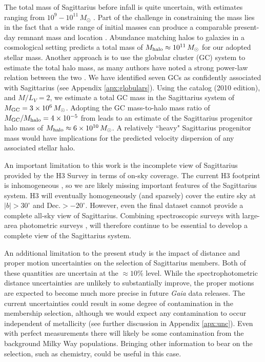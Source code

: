 \documentclass[twocolumn,tighten,twocolappendix]{aastex63}
\newcommand{\sgr}{Sagittarius}
\begin{document}
\begin{CJK*}{UTF8}{gbsn}
The total mass of \sgr{} before infall is quite uncertain, with estimates ranging from $10^{9}-10^{11}\, M_\odot$ \citep[e.g.,][]{Jiang00,Helmi01, LM10, Lokas10, Purcell11, Gibbons17,Laporte18}.  Part of the challenge in constraining the mass lies in the fact that a wide range of initial masses can produce a comparable present-day remnant mass and location \citep[e.g.,][]{Gibbons17}.  Abundance matching halos to galaxies in a cosmological setting predicts a total mass of $M_{\rm halo}\approx10^{11}\, M_\odot$ \citep{Behroozi19} for our adopted stellar mass.  Another approach is to use the globular cluster (GC) system to estimate the total halo mass, as many authors have noted a strong power-law relation between the two \citep[e.g.,][]{Hudson14, Harris17}.  We have identified seven GCs as confidently associated with \sgr{} (see Appendix \ref{apx:globulars}).  Using the \citet{Harris96} catalog (2010 edition), and $M/L_V=2$, we estimate a total GC mass in the \sgr{} system of $M_{\rm GC}=3\times10^6\, M_\odot$.  Adopting the GC mass-to-halo mass ratio of $M_{\rm GC}/M_{\rm halo}=4\times10^{-5}$ from \citet{Hudson14} leads to an estimate of the \sgr{} progenitor halo mass of $M_{\rm halo}\approx 6\times 10^{10}\, M_\odot$.  A relatively ``heavy" \sgr{} progenitor mass would have implications for the predicted velocity dispersion of any associated stellar halo.

An important limitation to this work is the incomplete view of \sgr{} provided by the H3 Survey in terms of on-sky coverage.  The current H3 footprint is inhomogeneous \citep[see][]{Conroy19a}, so we are likely missing important features of the \sgr{} system.  H3 will eventually homogeneously (and sparsely) cover the entire sky at $|b|>30^\circ$ and Dec.$>-20^\circ$.  However, even the final dataset cannot provide a complete all-sky view of \sgr{}.  Combining spectroscopic surveys with large-area photometric surveys \citep[e.g.,][]{Sesar17, Antoja20}, will therefore continue to be essential to develop a complete view of the \sgr{} system.

An additional limitation to the present study is the impact of distance and proper motion uncertainties on the selection of \sgr{} members.  Both of these quantities are uncertain at the $\approx10$\% level.  While the spectrophotometric distance uncertainties are unlikely to substantially improve, the proper motions are expected to become much more precise in future {\it Gaia} data releases.  The current uncertainties could result in some degree of contamination in the membership selection, although we would expect any contamination to occur independent of metallicity (see further discussion in Appendix \ref{apx:unc}).  Even with perfect measurements there will likely be some contamination from the background Milky Way populations. Bringing other information to bear on the selection, such as chemistry, could be useful in this case.


\end{CJK*}
\end{document}
